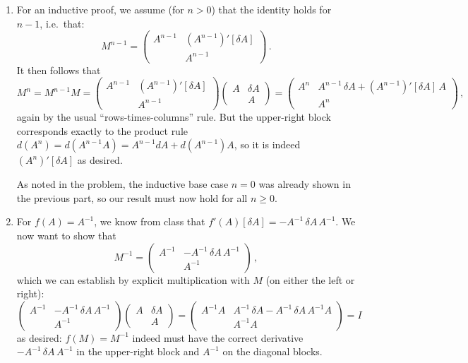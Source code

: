 \documentclass[10pt,oneside]{article}
\begin{document}
\begin{enumerate}
    \item For an inductive proof, we assume (for $n>0$) that the identity holds for $n-1$, i.e.~that:
    $$
    M^{n-1} = \begin{pmatrix} A^{n-1} & (A^{n-1})'[\delta A] \\ & A^{n-1} \end{pmatrix} \, .
    $$
    It then follows that 
    $$
    M^n = M^{n-1} M = \begin{pmatrix} A^{n-1} & (A^{n-1})'[\delta A] \\ & A^{n-1} \end{pmatrix} \begin{pmatrix} A & \delta A \\ & A \end{pmatrix} = \begin{pmatrix} A^n & A^{n-1} \, \delta A + (A^{n-1})'[\delta A] \, A \\ & A^n \end{pmatrix} \, ,
    $$
    again by the usual ``rows-times-columns'' rule.   But the upper-right block corresponds exactly to the product rule $d(A^n) = d(A^{n-1} A) = A^{n-1} dA + d(A^{n-1}) A$, so it is indeed $(A^{n})'[\delta A]$ as desired.

    As noted in the problem, the inductive base case $n=0$ was already shown in the previous part, so our result must now hold for all $n \ge 0$.

    \item For $f(A) = A^{-1}$, we know from class that $f'(A)[\delta A] = -A^{-1} \, \delta A \, A^{-1}$.  We now want to show that 
    $$
    M^{-1} = \begin{pmatrix} A^{-1} & -A^{-1} \, \delta A \, A^{-1} \\ & A^{-1} \end{pmatrix} \, ,
    $$
    which we can establish by explicit multiplication with $M$ (on either the left or right):
    $$
    \begin{pmatrix} A^{-1} & -A^{-1} \, \delta A \, A^{-1} \\ & A^{-1} \end{pmatrix} \begin{pmatrix} A & \delta A \\ & A \end{pmatrix}
    = \begin{pmatrix} A^{-1} A & A^{-1}\,\delta A -A^{-1} \, \delta A \, A^{-1} A \\ & A^{-1} A \end{pmatrix} = I
    $$
    as desired: $f(M) = M^{-1}$ indeed must have the correct derivative $-A^{-1} \, \delta A \, A^{-1}$ in the upper-right block and $A^{-1}$ on the diagonal blocks.
\end{enumerate}
 
\end{document}
